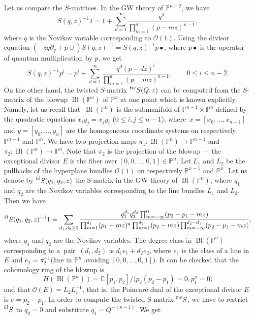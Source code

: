 \documentclass[10pt,a4paper]{article}
\numberwithin{equation}{section}
\newcommand{\leftexp}[2]{{\vphantom{#2}}^{#1}{#2}}
\newcommand{\CC}{\mathbb{C}}
\newcommand{\PP}{\mathbb{P}}
\renewcommand{\O}{\mathcal{O}}
\begin{document}
Let us compare the $S$-matrices. In the GW theory of $\PP^{n-2}$, we
have
\[
S(q,z)^{-1} 1 = 1 + \sum_{d=1}^\infty
\frac{q^d}{\prod_{m=1}^d (p- m z)^{n-1}},
\]
where $q$ is the Novikov variable corresponding to $\O(1)$.
Using the divisor equation $(-z q\partial_q + p\cup) S(q,z)^{-1} =
S(q,z)^{-1} p\bullet$, where $p\bullet$ is the operator of quantum
multiplication by $p$, we get
\begin{equation}\label{S-proj}
S(q,z)^{-1} p^i = p^i + \sum_{d=1}^\infty
\frac{q^d (p-d z)^i }{\prod_{m=1}^d (p-m z)^{n-1}},
\qquad 0\leq i\leq n-2.
\end{equation}
On the other hand, the twisted $S$-matrix $\leftexp{tw}{S}(Q,z)$ can
be computed from the $S$-matrix of the blowup
$\operatorname{Bl}(\PP^n)$ of $\PP^n$ at one point
which is known explicitly. Namely, let us recall that~$\operatorname{Bl}(\PP^n)$ is the submanifold of $\PP^{n-1}\times
\PP^n$ defined by the quadratic equations $x_i y_j=x_j y_i$
($0\leq i,j\leq n-1$), where~${x=[x_0,\dots, x_{n-1}]}$ and
$y=[y_0,\dots,y_{n}]$ are the homogeneous coordinate systems on
respectively $\PP^{n-1}$ and $\PP^{n}$. We have two projection maps
$\pi_1\colon \operatorname{Bl}(\PP^n)\to \PP^{n-1}$ and
${\pi_2\colon \operatorname{Bl}(\PP^n)\to \PP^{n}}$. Note that $\pi_2$ is the
projection of the blowup --- the exceptional divisor $E$ is the fiber
over $[0,0,\dots,0,1]\in \PP^n$. Let $L_1$ and $L_2$ be the pullbacks
of the hyperplane bundles $\O(1)$ on respectively $\PP^{n-1}$ and
$\PP^{n}$. Let us denote by $\leftexp{bl}{S}(q_1,q_2,z)$ the S-matrix
in the GW theory of $\operatorname{Bl}(\PP^n)$, where $q_1$ and $q_2$
are the Novikov variables corresponding to the line bundles $L_1$ and
$L_2$. Then we have
\[
\leftexp{bl}{S}(q_1,q_2,z)^{-1} 1 =
\sum_{d_1,d_2\geq 0}
\frac{q_1^{d_1} q_2^{d_2} \prod_{m=-\infty}^0 (p_2-p_1 -mz) }{
\prod_{m=1}^{d_1} (p_1-mz)^n
\prod_{m=1}^{d_2} (p_2-mz)
\prod_{m=-\infty}^{d_2-d_1} (p_2-p_1 -mz)},
\]
where $q_1$ and $q_2$ are the Novikov variables. The degree class in
$\operatorname{Bl}(\PP^n) $ corresponding to a~pair~${(d_1,d_2)}$ is
$d_1 e_1+ d_2 e_2$, where $e_1$ is the class of a line in $E$ and
$e_2=\pi_2^{-1}($line in $\PP^n$ avoiding $[0,0,\dots,0,1])$. It can
be checked that the cohomology ring of the blowup is
\[
H(\operatorname{Bl}(\PP^n))=\CC[p_1,p_2]/
\langle p_2(p_2-p_1)=0, p_1^n=0\rangle
\]
and that $\O(E)=L_2L_1^{-1}$, that is, the Poincar\'e dual of the
exceptional divisor $E$ is $e=p_2-p_1$. In order to compute the
twisted S-matrix $\leftexp{tw}{S}$, we have to restrict
$\leftexp{bl}{S}$ to $q_2=0$ and substitute $q_1=Q^{-(n-1)}$. We get
\end{document}
